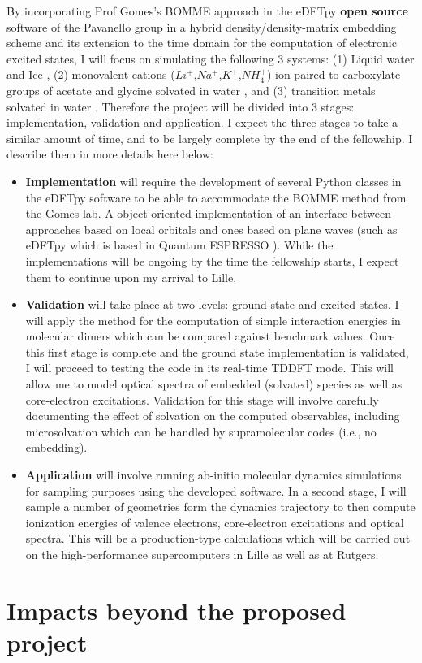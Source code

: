 \documentclass[notitlepage,12pt]{report}
\begin{document}
    By incorporating Prof Gomes's BOMME approach in the eDFTpy\supercite{edftpy} {\bf open source} software of the Pavanello group in a hybrid density/density-matrix embedding scheme and its extension to the time domain for the computation of electronic excited states, I will focus on simulating the following 3 systems: (1) Liquid water\supercite{gaiduk2018electron} and Ice \supercite{bergmann2007nearest,zhovtobriukh2019x}, (2) monovalent cations ($Li^{+}$,$Na^{+}$,$K^{+}$,$NH_4^{+}$) ion-paired to carboxylate groups of acetate and glycine solvated in water \supercite{aziz2008cation}, and (3) transition metals solvated in water \supercite{N_slund_2003,zheng2018enabling}. Therefore the project will be divided into 3 stages: implementation, validation and application. I expect the three stages to take a similar amount of time, and to be largely complete by the end of the fellowship. I describe them in more details here below:
    \begin{itemize}
        \item {\bf Implementation} will require the development of several Python classes in the eDFTpy software to be able to accommodate the BOMME method from the Gomes lab. A object-oriented implementation of an interface between approaches based on local orbitals and ones based on plane waves (such as eDFTpy which is based in Quantum ESPRESSO \supercite{qe}). While the implementations will be ongoing by the time the fellowship starts, I expect them to continue upon my arrival to Lille.
        \item {\bf Validation} will take place at two levels: ground state and excited states. I will apply the method for the computation of simple interaction energies in molecular dimers which can be compared against benchmark values. Once this first stage is complete and the ground state implementation is validated, I will proceed to testing the code in its real-time TDDFT mode. This will allow me to model optical spectra of embedded (solvated) species as well as core-electron excitations. Validation for this stage will involve carefully documenting the effect of solvation on the computed  observables, including microsolvation which can be handled by supramolecular codes (i.e., no embedding).
        \item {\bf Application} will involve running ab-initio molecular dynamics simulations for sampling purposes using the developed software. In a second stage, I will sample a number of geometries form the dynamics trajectory to then compute ionization energies of valence electrons, core-electron excitations and optical spectra. This will be a production-type calculations which will be carried out on the high-performance supercomputers in Lille as well as at Rutgers. 
    \end{itemize}

\section{Impacts beyond the proposed project}
\printbibliography
\end{document}
